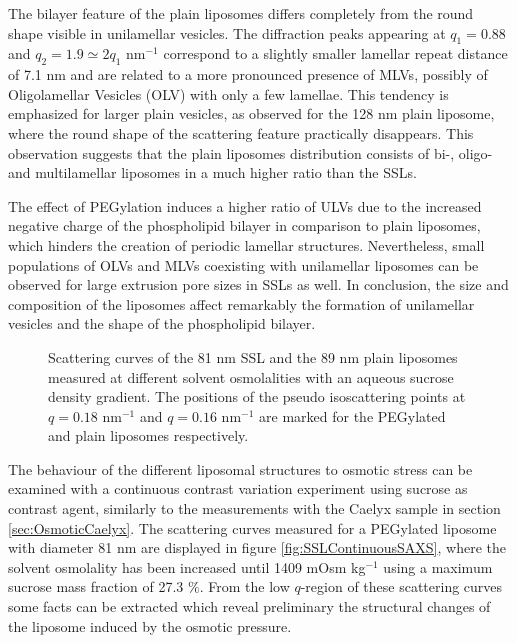 The bilayer feature of the plain liposomes differs completely from the round shape visible in unilamellar vesicles. The diffraction peaks appearing at $q_1=0.88$ and $q_2=1.9\simeq2q_1$ nm$^{-1}$ correspond to a slightly smaller lamellar repeat distance of 7.1 nm and are related to a more pronounced presence of MLVs, possibly of Oligolamellar Vesicles (OLV) with only a few lamellae. This tendency is emphasized for larger plain vesicles, as observed for the 128 nm plain liposome, where the round shape of the scattering feature practically disappears. This observation suggests that the plain liposomes distribution consists of bi-, oligo- and multilamellar liposomes in a much higher ratio than the SSLs.

The effect of PEGylation induces a higher ratio of ULVs due to the increased negative charge of the phospholipid bilayer in comparison to plain liposomes, which hinders the creation of periodic lamellar structures. Nevertheless, small populations of OLVs and MLVs coexisting with unilamellar liposomes can be observed for large extrusion pore sizes in SSLs as well. In conclusion, the size and composition of the liposomes affect remarkably the formation of unilamellar vesicles and the shape of the phospholipid bilayer.

\begin{figure}
	\centering
		\subfloat[SSL 81 nm]{\resizebox{0.46\linewidth}{!}{\figfont{13pt}}\label{fig:SSLContinuousSAXS}}
		\subfloat[Plain 89 nm]{\resizebox{0.46\linewidth}{!}{\figfont{13pt}}\label{fig:PlainLiposomeContinuousSAXS}}
		\caption[Scattering curves of the liposomes measured at different solvent osmolalities.]{Scattering curves of the 81 nm SSL and the 89 nm plain liposomes measured at different solvent osmolalities with an aqueous sucrose density gradient. The positions of the pseudo isoscattering points at $q=0.18$ nm$^{-1}$ and $q=0.16$ nm$^{-1}$ are marked for the PEGylated and plain liposomes respectively.}
\end{figure}

The behaviour of the different liposomal structures to osmotic stress can be examined with a continuous contrast variation experiment using sucrose as contrast agent, similarly to the measurements with the Caelyx sample in section \ref{sec:OsmoticCaelyx}. The scattering curves measured for a PEGylated liposome with diameter 81 nm are displayed in figure \ref{fig:SSLContinuousSAXS}, where the solvent osmolality has been increased until 1409 mOsm kg$^{-1}$ using a maximum sucrose mass fraction of 27.3 $\%$. From the low $q$-region of these scattering curves some facts can be extracted which reveal preliminary the structural changes of the liposome induced by the osmotic pressure.


